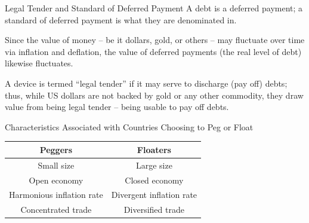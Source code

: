 \documentclass[international_finance_p1.tex]{subfiles}
\begin{document}
\begin{frame}{Legal Tender and Standard of Deferred Payment}
A debt is a deferred payment; a standard of deferred payment is what they are denominated in. 

Since the value of money – be it dollars, gold, or others – may fluctuate over time via inflation and deflation, the value of deferred payments (the real level of debt) likewise fluctuates. 

A device is termed ``legal tender'' if it may serve to discharge (pay off) debts; thus, while US dollars are not backed by gold or any other commodity, they draw value from being legal tender – being usable to pay off debts.
\end{frame}
\begin{frame}{Characteristics Associated with Countries Choosing to Peg or Float}
\begin{table}[htbp]
  \centering
    \begin{tabular}{cc}
    \toprule
    Peggers & Floaters \\
    \midrule
    Small size & Large size  \\
    Open economy & Closed economy  \\
    Harmonious inflation rate  & Divergent inflation rate \\
    Concentrated trade  & Diversified trade \\
    \bottomrule
    \end{tabular}%
  \label{tab:addlabel}%
\end{table}%
\end{frame}
\end{document}
